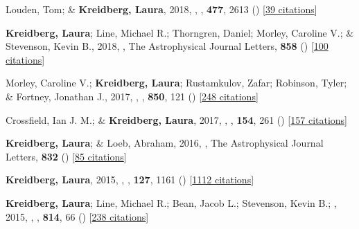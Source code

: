 \item[{\color{numcolor}\scriptsize11}] Louden, Tom; \& \textbf{Kreidberg, Laura}, 2018, , \mnras, \textbf{477}, 2613 () [\href{https://ui.adsabs.harvard.edu/abs/2018MNRAS.477.2613L}{39 citations}]

\item[{\color{numcolor}\scriptsize10}] \textbf{Kreidberg, Laura}; Line, Michael R.; Thorngren, Daniel; Morley, Caroline V.; \& Stevenson, Kevin B., 2018, , The Astrophysical Journal Letters, \textbf{858} () [\href{https://ui.adsabs.harvard.edu/abs/2018ApJ...858L...6K}{100 citations}]

\item[{\color{numcolor}\scriptsize9}] Morley, Caroline V.; \textbf{Kreidberg, Laura}; Rustamkulov, Zafar; Robinson, Tyler; \& Fortney, Jonathan J., 2017, , \apj, \textbf{850}, 121 () [\href{https://ui.adsabs.harvard.edu/abs/2017ApJ...850..121M}{248 citations}]

\item[{\color{numcolor}\scriptsize8}] Crossfield, Ian J. M.; \& \textbf{Kreidberg, Laura}, 2017, , \aj, \textbf{154}, 261 () [\href{https://ui.adsabs.harvard.edu/abs/2017AJ....154..261C}{157 citations}]

\item[{\color{numcolor}\scriptsize7}] \textbf{Kreidberg, Laura}; \& Loeb, Abraham, 2016, , The Astrophysical Journal Letters, \textbf{832} () [\href{https://ui.adsabs.harvard.edu/abs/2016ApJ...832L..12K}{85 citations}]

\item[{\color{numcolor}\scriptsize6}] \textbf{Kreidberg, Laura}, 2015, , \pasp, \textbf{127}, 1161 () [\href{https://ui.adsabs.harvard.edu/abs/2015PASP..127.1161K}{1112 citations}]

\item[{\color{numcolor}\scriptsize5}] \textbf{Kreidberg, Laura}; Line, Michael R.; Bean, Jacob L.; Stevenson, Kevin B.; \etal, 2015, , \apj, \textbf{814}, 66 () [\href{https://ui.adsabs.harvard.edu/abs/2015ApJ...814...66K}{238 citations}]

